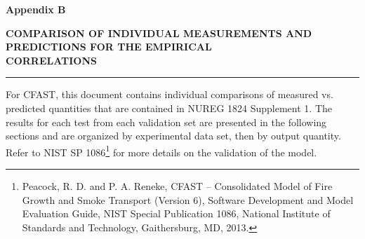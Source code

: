 \documentclass[12pt, titlepage, twoside]{article}
\begin{document}
\thispagestyle{empty}

\huge
\noindent \textbf{Appendix B}

\vspace{0.5em}
\LARGE
\noindent \textbf{COMPARISON OF INDIVIDUAL MEASUREMENTS AND PREDICTIONS FOR THE EMPIRICAL \\ CORRELATIONS}

\normalsize

\vspace{1.5em}
\hrule
\vspace{1.0em}

For CFAST, this document contains individual comparisons of measured vs. predicted quantities that are contained in NUREG 1824 Supplement 1. The results for each test from each validation set are presented in the following sections and are organized by experimental data set, then by output quantity. Refer to NIST SP 1086\footnote{Peacock, R. D. and P. A. Reneke, CFAST -- Consolidated Model of Fire Growth and Smoke Transport (Version 6), Software Development and Model Evaluation Guide, NIST Special Publication 1086, National Institute of Standards and Technology, Gaithersburg, MD, 2013.} for more details on the validation of the model.

\clearpage
{}
\thispagestyle{empty}
\tableofcontents

\appendix

\setcounter{section}{1}


\end{document}
